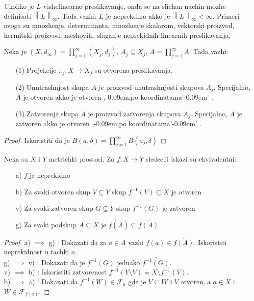 \documentclass[a4paper,12pt]{article}
\newcommand{\psj}{\subseteq}
\newcommand{\ds}{\displaystyle}
\newcommand{\norm}[1]{\left\lVert#1\right\rVert}
\def\zn{,\kern-0.09em,} %
\def\zng{'\kern-0.09em' } %
\begin{document}
\begin{nap}
	Ukoliko je $L$ vishelinearno preslikavanje, onda se na slichan nachin mozhe definisati $\norm L _{\infty}$. Tada
	vazhi: $L$ je neprekdino akko je $\norm L _{\infty} < \infty$. Primeri ovoga su mnozhenje, determinanta, 
	mnozhenje skalarom, vektorski proizvod, hermitski proizvod, meshoviti, slaganje neprekidnih
	linearnih preslikavanja, \dotso
\end{nap}

\newpage

\begin{tvr}
	Neka je $\ds{(X,d_\infty) = \prod_{j=1}^{\infty}(X_j, d_j)}$, $A_j\psj X_j$, $\ds{A = \prod_{j=1}^{\infty}A}$. Tada vazhi:
	\begin{enumerate}
		\item[(1)] Projekcije $\pi_j:X \to X_j$ su otvorena preslikavanja.
		\item[(2)] Unutrashnjost skupa $A$ je proizvod unutrashnjosti skupova $A_j$. Specijalno, $A$ je otvoren akko je otvoren \zn po koordinatama\zng.
		\item[(3)] Zatvorenje skupa $A$ je proizvod zatvorenja skupova $A_j$. Specijalno, $A$ je zatvoren akko je otvoren \zn po koordinatama\zng.
	\end{enumerate}
\end{tvr}
\begin{proof}
	Iskoristiti da je $\ds{B(a, \delta) = \prod_{j=1}^{\infty}B(a_j, \delta)}$
\end{proof}

\begin{tma}
Neka su $X$ i $Y$ metrichki prostori. Za $f:X \to Y$ sledec1i iskazi su ekviva\-lentni:
\begin{itemize}
\item[a)] $f$ je neprekidno
\item[b)] Za svaki otvoren skup $V \psj Y$ skup $f^{-1}(V) \psj X$ je otvoren
\item[v)] Za svaki zatvoren skup $G \psj Y$ skup $f^{-1}(G)$ je zatvoren
\item[g)] Za svaki podskup $A \psj X$ je $f(\overline{A}) \psj \overline{f(A)}$
\end{itemize}
\end{tma}

\begin{proof}
a) $\implies$ g) : Dokazati da za $a\in \overline{A}$ vazhi $f(a) \in \overline{f(A)}$. Iskoristiti neprekidnost u tachki $a$. \\ 
g) $\implies$ v) : Dokazati da je $f^{-1}(G)$ jednako $\overline{f^{-1}(G)}$. \\
v) $\implies$ b) : Iskoristiti zatvorenost $f^{-1}(Y \setminus V) = X \setminus f^{-1}(V)$. \\
b) $\implies$ a) : Dokazati da $f^{-1}(W) \in \mathcal{F}_a$ gde je $V \psj W$ i $V$ otvoren, a $a \in X$ i $W \in \mathcal{F}_{f(a)}$. 
\end{proof}
\end{document}
